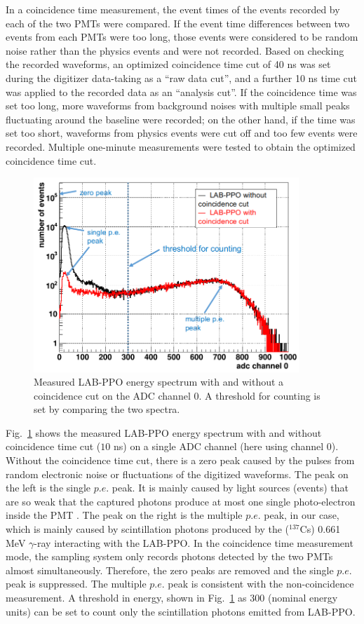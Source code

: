 In a coincidence time measurement, the event times of the events recorded by each of the two PMTs were compared. If the event time differences between two events from each PMTs were too long, those events were considered to be random noise rather than the physics events and were not recorded. Based on checking the recorded waveforms, an optimized coincidence time cut of 40 ns was set during the digitizer data-taking as a ``raw data cut'', and a further 10 ns time cut was applied to the recorded data as an ``analysis cut''. If the coincidence time was set too long, more waveforms from background noises with multiple small peaks fluctuating around the baseline were recorded; on the other hand, if the time was set too short, waveforms from physics events were cut off and too few events were recorded. Multiple one-minute measurements were tested to obtain the optimized coincidence time cut.

\begin{figure}[htbp]
	\centering	
	\includegraphics[width=10cm]{TeLScoinCut.png}
	\caption[Measured LAB-PPO energy spectrum with and without coincidence cut.]{Measured LAB-PPO energy spectrum with and without a coincidence cut on the ADC channel 0. A threshold for counting is set by comparing the two spectra.}
	\label{teLScoinCut}
\end{figure}

Fig.~\ref{teLScoinCut} shows the measured LAB-PPO energy spectrum with and without coincidence time cut ($10$ ns) on a single ADC channel (here using channel 0). Without the coincidence time cut, there is a zero peak caused by the pulses from random electronic noise or fluctuations of the digitized waveforms. The peak on the left is the single $p.e.$ peak. It is mainly caused by light sources (events) that are so weak that the captured photons produce at most one single photo-electron inside the PMT \cite{leo2012techniques}. The peak on the right is the multiple $p.e.$ peak, in our case, which is mainly caused by scintillation photons produced by the ($^{137}$Cs) 0.661 MeV $\gamma$-ray interacting with the LAB-PPO. In the coincidence time measurement mode, the sampling system only records photons detected by the two PMTs almost simultaneously. Therefore, the zero peaks are removed and the single $p.e.$ peak is suppressed. The multiple $p.e.$ peak is consistent with the non-coincidence measurement. A threshold in energy, shown in Fig.~\ref{teLScoinCut} as 300 (nominal energy units) can be set to count only the scintillation photons emitted from LAB-PPO. 

